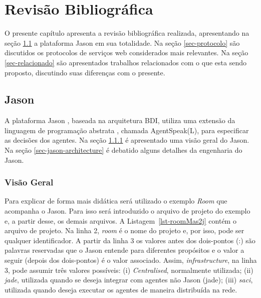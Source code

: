 \chapter{Revisão Bibliográfica} \label{chap-levantamentoBibliografico}

O presente capítulo apresenta a revisão bibliográfica realizada,
apresentando na seção \ref{sec-jason} a plataforma Jason
em sua totalidade. Na seção \ref{sec-protocolo} são discutidos os
protocolos de serviços web considerados mais relevantes. Na seção
\ref{sec-relacionado} são apresentados trabalhos relacionados com o
que esta sendo proposto, discutindo suas diferenças com o presente.

\section{Jason} \label{sec-jason}

A plataforma Jason \cite{bordini-jason}, baseada na arquitetura BDI,
utiliza uma extensão da linguagem de programação abstrata \cite{rao1996agentspeak},
 chamada AgentSpeak(L), para especificar as decisões
dos agentes. Na seção \ref{sec-jason-overview} é apresentado uma
visão geral do Jason. Na seção \ref{sec-jason-architecture} é
debatido alguns detalhes da engenharia do Jason.

\subsection{Visão Geral} \label{sec-jason-overview}

Para explicar de forma mais didática será utilizado o
exemplo \emph{Room} que acompanha o Jason. Para isso será introduzido
o arquivo de projeto do exemplo e, a partir desse, os demais arquivos.
A Listagem~\ref{lst-roomMas2j} contém o arquivo de projeto.
Na linha 2, \emph{room} é o nome do projeto e, por isso, pode ser qualquer
identificador. A partir da linha 3 os valores antes dos dois-pontos (:)
são palavras reservadas que o Jason entende para diferentes propósitos e o valor
a seguir (depois dos dois-pontos) é o valor associado.
Assim, \emph{infrastructure}, na linha 3, pode assumir três valores
possíveis: (i) \emph{Centralised}, normalmente utilizada;
(ii) \emph{jade}, utilizada quando se deseja integrar
com agentes não Jason (jade); (iii) \emph{saci}, utilizada
quando deseja executar os agentes de maneira distribuída na rede.

